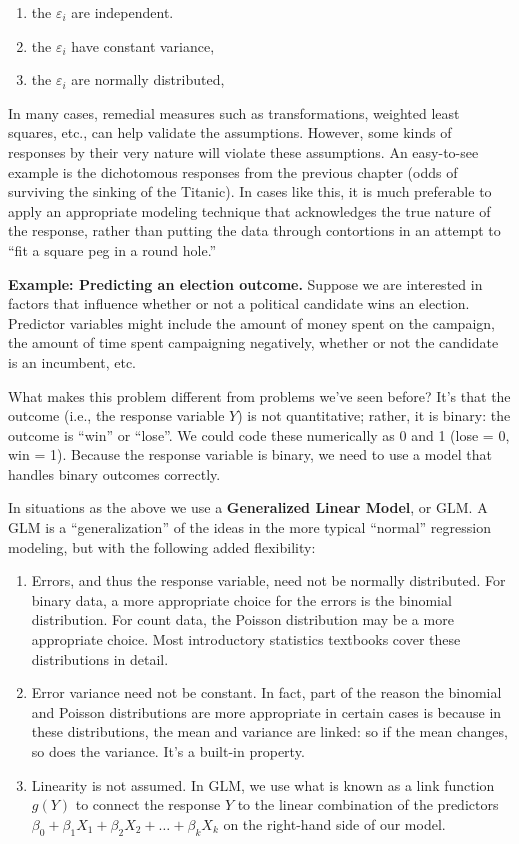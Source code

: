 \documentclass[
]{book}
\providecommand{\tightlist}{%
  \setlength{\itemsep}{0pt}\setlength{\parskip}{0pt}}
\begin{document}
\begin{enumerate}
\def\labelenumi{\arabic{enumi}.}
\tightlist
\item
  the \(\varepsilon_i\) are independent.
\item
  the \(\varepsilon_i\) have constant variance,
\item
  the \(\varepsilon_i\) are normally distributed,
\end{enumerate}

In many cases, remedial measures such as transformations, weighted least squares, etc., can help validate the assumptions. However, some kinds of responses by their very nature will violate these assumptions. An easy-to-see example is the dichotomous responses from the previous chapter (odds of surviving the sinking of the Titanic). In cases like this, it is much preferable to apply an appropriate modeling technique that acknowledges the true nature of the response, rather than putting the data through contortions in an attempt to ``fit a square peg in a round hole.''

\textbf{Example: Predicting an election outcome.} Suppose we are interested in factors that influence whether or not a political candidate wins an election. Predictor variables might include the amount of money spent on the campaign, the amount of time spent campaigning negatively, whether or
not the candidate is an incumbent, etc.

What makes this problem different from problems we've seen before? It's that the outcome (i.e., the response variable \(Y\)) is not quantitative; rather, it is binary: the outcome is ``win'' or ``lose''. We could code these numerically as 0 and 1 (lose = 0, win = 1). Because the response variable is
binary, we need to use a model that handles binary outcomes correctly.

In situations as the above we use a \textbf{Generalized Linear Model}, or GLM. A GLM is a ``generalization'' of the ideas in the more
typical ``normal'' regression modeling, but with the following added flexibility:

\begin{enumerate}
\def\labelenumi{\arabic{enumi}.}
\tightlist
\item
  Errors, and thus the response variable, need not be normally distributed. For binary data, a more appropriate choice for
  the errors is the binomial distribution. For count data, the Poisson distribution may be a more appropriate choice. Most introductory statistics textbooks cover these distributions in detail.
\item
  Error variance need not be constant. In fact, part of the reason the binomial and Poisson distributions are more appropriate in certain cases is because in these distributions, the mean and variance are linked: so if the mean changes, so does the variance. It's a built-in property.
\item
  Linearity is not assumed. In GLM, we use what is known as a link function \(g(Y)\) to connect the response \(Y\) to the linear combination of the predictors \(\beta_0 + \beta_1 X_1 + \beta_2 X_2 + \ldots + \beta_k X_k\) on the right-hand side of our model.
\end{enumerate}
\end{document}
